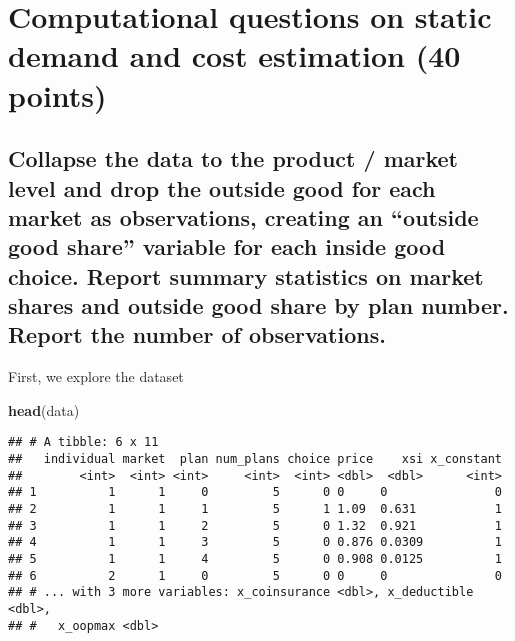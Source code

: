 \documentclass[]{article}
\newenvironment{Shaded}{\begin{snugshade}}{\end{snugshade}}
\newcommand{\KeywordTok}[1]{\textcolor[rgb]{0.13,0.29,0.53}{\textbf{#1}}}
\newcommand{\NormalTok}[1]{#1}
\begin{document}
\hypertarget{computational-questions-on-static-demand-and-cost-estimation-40-points}{%
\section{Computational questions on static demand and cost estimation
(40
points)}\label{computational-questions-on-static-demand-and-cost-estimation-40-points}}

\hypertarget{collapse-the-data-to-the-product-market-level-and-drop-the-outside-good-for-each-market-as-observations-creating-an-outside-good-share-variable-for-each-inside-good-choice.-report-summary-statistics-on-market-shares-and-outside-good-share-by-plan-number.-report-the-number-of-observations.}{%
\subsection{Collapse the data to the product / market level and drop the
outside good for each market as observations, creating an ``outside good
share'' variable for each inside good choice. Report summary statistics
on market shares and outside good share by plan number. Report the
number of
observations.}\label{collapse-the-data-to-the-product-market-level-and-drop-the-outside-good-for-each-market-as-observations-creating-an-outside-good-share-variable-for-each-inside-good-choice.-report-summary-statistics-on-market-shares-and-outside-good-share-by-plan-number.-report-the-number-of-observations.}}

First, we explore the dataset

\begin{Shaded}
\begin{Highlighting}[]
\KeywordTok{head}\NormalTok{(data)}
\end{Highlighting}
\end{Shaded}

\begin{verbatim}
## # A tibble: 6 x 11
##   individual market  plan num_plans choice price    xsi x_constant
##        <int>  <int> <int>     <int>  <int> <dbl>  <dbl>      <int>
## 1          1      1     0         5      0 0     0               0
## 2          1      1     1         5      1 1.09  0.631           1
## 3          1      1     2         5      0 1.32  0.921           1
## 4          1      1     3         5      0 0.876 0.0309          1
## 5          1      1     4         5      0 0.908 0.0125          1
## 6          2      1     0         5      0 0     0               0
## # ... with 3 more variables: x_coinsurance <dbl>, x_deductible <dbl>,
## #   x_oopmax <dbl>
\end{verbatim}
\end{document}
